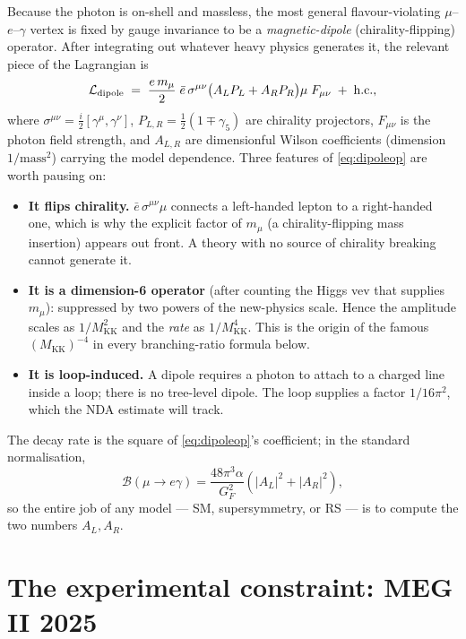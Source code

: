 \documentclass[11pt]{article}
\newcommand{\MKK}{M_{\mathrm{KK}}}
\newcommand{\BR}{\mathcal{B}}
\theoremstyle{definition}
\begin{document}
Because the photon is on-shell and massless, the most general
flavour-violating $\mu$--$e$--$\gamma$ vertex is fixed by gauge invariance to be
a \emph{magnetic-dipole} (chirality-flipping) operator. After integrating out
whatever heavy physics generates it, the relevant piece of the Lagrangian is
\begin{equation}
\mathcal{L}_{\rm dipole} \;=\;
   \frac{e\,m_\mu}{2}\;\bar e\,\sigma^{\mu\nu}\big(A_L P_L + A_R P_R\big)\mu\;
   F_{\mu\nu} \;+\; \text{h.c.},
\label{eq:dipoleop}
\end{equation}
where $\sigma^{\mu\nu}=\tfrac{i}{2}[\gamma^\mu,\gamma^\nu]$,
$P_{L,R}=\tfrac{1}{2}(1\mp\gamma_5)$ are chirality projectors, $F_{\mu\nu}$ is the
photon field strength, and $A_{L,R}$ are dimensionful Wilson coefficients
(dimension $1/\text{mass}^2$) carrying the model dependence. Three features of
\eqref{eq:dipoleop} are worth pausing on:
\begin{itemize}[leftmargin=1.4em]
\item \textbf{It flips chirality.} $\bar e\,\sigma^{\mu\nu}\mu$ connects a
left-handed lepton to a right-handed one, which is why the explicit factor of
$m_\mu$ (a chirality-flipping mass insertion) appears out front. A theory with no
source of chirality breaking cannot generate it.
\item \textbf{It is a dimension-6 operator} (after counting the Higgs vev that
supplies $m_\mu$): suppressed by two powers of the new-physics scale. Hence the
amplitude scales as $1/\MKK^2$ and the \emph{rate} as $1/\MKK^4$. This is the
origin of the famous $(\MKK)^{-4}$ in every branching-ratio formula below.
\item \textbf{It is loop-induced.} A dipole requires a photon to attach to a
charged line inside a loop; there is no tree-level dipole. The loop supplies a
factor $1/16\pi^2$, which the NDA estimate will track.
\end{itemize}
The decay rate is the square of \eqref{eq:dipoleop}'s coefficient; in the
standard normalisation,
\begin{equation}
\BR(\mu\to e\gamma) = \frac{48\pi^3\alpha}{G_F^2}
   \left(|A_L|^2 + |A_R|^2\right),
\label{eq:brgeneric}
\end{equation}
so the entire job of any model --- SM, supersymmetry, or RS --- is to compute the
two numbers $A_L, A_R$.

\section{The experimental constraint: MEG II 2025}
\label{sec:expt}
\end{document}
